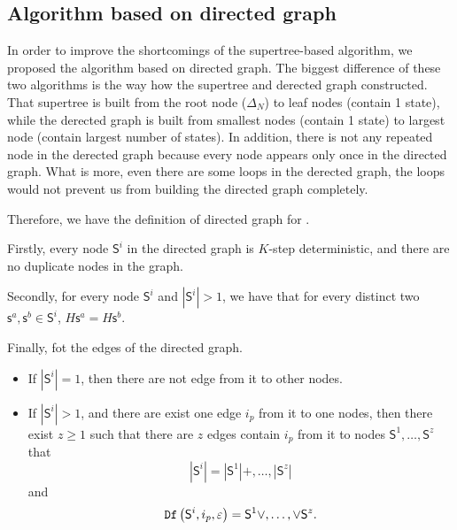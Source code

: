 \subsection{Algorithm based on directed graph}
In order to improve the shortcomings of the supertree-based algorithm, we proposed the algorithm based on directed graph. The biggest difference of these two algorithms is the way how the  supertree and derected graph constructed. That supertree is built from the root node ($\Delta_N$) to leaf nodes (contain 1 state), while the derected graph is built from smallest nodes (contain 1 state) to largest node (contain largest number of states). In addition, there is not any repeated node in the derected graph because every node appears only once in the directed graph. What is more, even there are some loops in the derected graph, the loops would not prevent us from building the directed graph completely.

Therefore, we have the definition of directed graph for \BCNs.
\begin{definition}
Firstly, every node $\mathsf{S}^i$ in the directed graph is $K$-step deterministic, and there are no duplicate nodes in the graph. 

Secondly, for every node $\mathsf{S}^i$  and $|\mathsf{S}^i|>1$, we have that for every distinct two $\mathsf{s}^a, \mathsf{s}^b \in \mathsf{S}^i$, $H\mathsf{s}^a=H\mathsf{s}^b$. 

Finally, fot the edges of the directed graph. 
\begin{itemize}
 \item If $|\mathsf{S}^i|=1$, then there are not edge from it to other nodes.
 \item  If $|\mathsf{S}^i|>1$, and there are exist one edge $i_p$ from it to one nodes, then there exist $z\ge 1$ such that there are $z$ edges contain $i_p$ from it to nodes $\mathsf{S}^1,\ldots,\mathsf{S}^z$ that \[|\mathsf{S}^i|= |\mathsf{S}^1|+,\ldots,|\mathsf{S}^z|\] and \[{\tt Df}\left(\mathsf{S}^i,i_p,\varepsilon\right)=\mathsf{S}^1\vee,\ldots,\vee \mathsf{S}^z.\]
 \end{itemize}

\end{definition}

